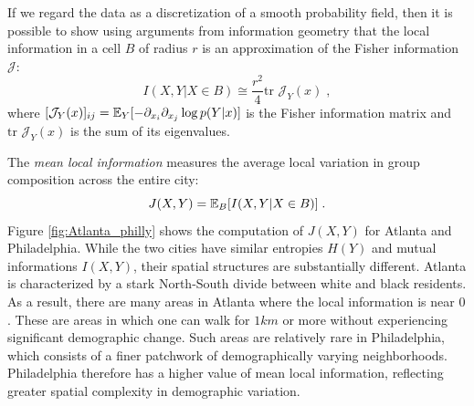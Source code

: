 \documentclass[9pt,twocolumn,twoside]{pnas-new}
\begin{document}
	If we regard the data as a discretization of a smooth probability field, then it is possible to show using arguments from information geometry \cite{Amari2000} that the local information in a cell $B$ of radius $r$ is an approximation of the Fisher information $\mathcal{J}$:
	\begin{equation}
		I(X,Y|X \in B) \cong \frac{r^2}{4} \text{tr } \mathcal{J}_Y(x)\;, \label{eq:fisher_approx}
	\end{equation}
	where $[\mathcal{J}_Y(x)]_{ij} = \mathbb{E}_Y[-\partial_{x_i} \partial_{x_j} \log p(Y|x)]$ is the Fisher information matrix and $\text{tr } \mathcal{J}_Y(x)$ is the sum of its eigenvalues. 

	The \emph{mean local information} measures the average local variation in group composition across the entire city:  
	\begin{equation}
		J(X,Y) = \mathbb{E}_B[I(X,Y|X \in B)]\;.
	\end{equation}
	Figure \ref{fig:Atlanta_philly} shows the computation of $J(X,Y)$ for Atlanta and Philadelphia. While the two cities have similar entropies $H(Y)$ and mutual informations $I(X,Y)$, their spatial structures are substantially different. Atlanta is characterized by a stark North-South divide between white and black residents. As a result, there are many areas in Atlanta where the local information is near $0$. These are areas in which one can walk for $1km$ or more without experiencing significant demographic change. Such areas are relatively rare in Philadelphia, which consists of a finer patchwork of demographically varying neighborhoods. Philadelphia therefore has a higher value of mean local information, reflecting greater spatial complexity in demographic variation. 
\end{document}
